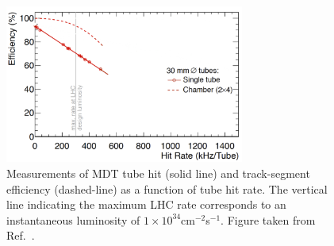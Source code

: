 \begin{figure}[!htb]
    \begin{center}
        \includegraphics[width=0.7\textwidth]{figures/nsw/nsw_mdt_track_reco_eff}
        \caption{
            Measurements of MDT tube hit (solid line) and track-segment efficiency (dashed-line)
            as a function of tube hit rate.
            The vertical line indicating the maximum LHC rate corresponds to an instantaneous
            luminosity of $1\times10^{34}$cm$^{-2}$s$^{-1}$.
            Figure taken from Ref.~\cite{NSWTDR}.
        }
        \label{fig:nsw_mdt_track_reco}
    \end{center}
\end{figure}
